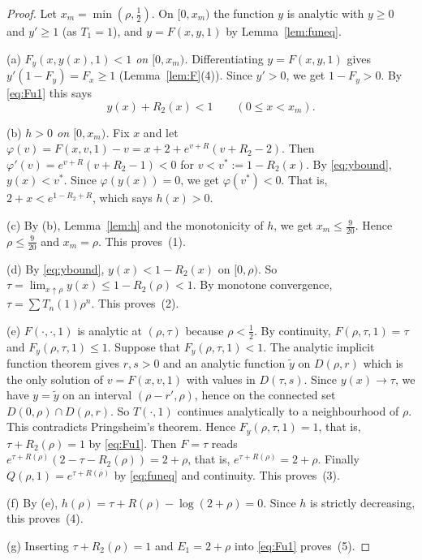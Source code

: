 \documentclass[11pt]{amsart}
\theoremstyle{definition}
\theoremstyle{remark}
\numberwithin{equation}{section}
\begin{document}
\begin{proof}
Let \(x_m=\min(\rho,\frac12)\). On \([0,x_m)\) the function \(y\) is analytic with \(y\ge0\) and \(y'\ge1\) (as \(T_1=1\)), and \(y=F(x,y,1)\) by Lemma~\ref{lem:funeq}.

(a) \emph{\(F_y(x,y(x),1)<1\) on \([0,x_m)\).} Differentiating \(y=F(x,y,1)\) gives \(y'(1-F_y)=F_x\ge1\) (Lemma~\ref{lem:F}(4)). Since \(y'>0\), we get \(1-F_y>0\). By \eqref{eq:Fu1} this says
\begin{equation}\label{eq:ybound}
y(x)+R_2(x)<1\qquad(0\le x<x_m).
\end{equation}

(b) \emph{\(h>0\) on \([0,x_m)\).} Fix \(x\) and let \(\varphi(v)=F(x,v,1)-v=x+2+e^{v+R}(v+R_2-2)\). Then \(\varphi'(v)=e^{v+R}(v+R_2-1)<0\) for \(v<v^\ast:=1-R_2(x)\). By \eqref{eq:ybound}, \(y(x)<v^\ast\). Since \(\varphi(y(x))=0\), we get \(\varphi(v^\ast)<0\). That is, \(2+x<e^{1-R_2+R}\), which says \(h(x)>0\).

(c) By (b), Lemma~\ref{lem:h} and the monotonicity of \(h\), we get \(x_m\le\frac9{20}\). Hence \(\rho\le\frac9{20}\) and \(x_m=\rho\). This proves~(1).

(d) By \eqref{eq:ybound}, \(y(x)<1-R_2(x)\) on \([0,\rho)\). So \(\tau=\lim_{x\uparrow\rho}y(x)\le1-R_2(\rho)<1\). By monotone convergence, \(\tau=\sum T_n(1)\rho^n\). This proves~(2).

(e) \(F(\cdot,\cdot,1)\) is analytic at \((\rho,\tau)\) because \(\rho<\frac12\). By continuity, \(F(\rho,\tau,1)=\tau\) and \(F_y(\rho,\tau,1)\le1\). Suppose that \(F_y(\rho,\tau,1)<1\). The analytic implicit function theorem gives \(r,s>0\) and an analytic function \(\tilde y\) on \(D(\rho,r)\) which is the only solution of \(v=F(x,v,1)\) with values in \(D(\tau,s)\). Since \(y(x)\to\tau\), we have \(y=\tilde y\) on an interval \((\rho-r',\rho)\), hence on the connected set \(D(0,\rho)\cap D(\rho,r)\). So \(T(\cdot,1)\) continues analytically to a neighbourhood of \(\rho\). This contradicts Pringsheim's theorem. Hence \(F_y(\rho,\tau,1)=1\), that is, \(\tau+R_2(\rho)=1\) by \eqref{eq:Fu1}. Then \(F=\tau\) reads \(e^{\tau+R(\rho)}(2-\tau-R_2(\rho))=2+\rho\), that is, \(e^{\tau+R(\rho)}=2+\rho\). Finally \(Q(\rho,1)=e^{\tau+R(\rho)}\) by \eqref{eq:funeq} and continuity. This proves~(3).

(f) By (e), \(h(\rho)=\tau+R(\rho)-\log(2+\rho)=0\). Since \(h\) is strictly decreasing, this proves~(4).

(g) Inserting \(\tau+R_2(\rho)=1\) and \(E_1=2+\rho\) into \eqref{eq:Fu1} proves~(5).
\end{proof}
\end{document}
